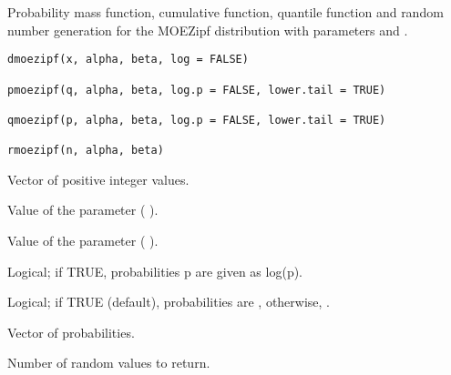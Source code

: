 \documentclass[letterpaper]{book}
\begin{document}
\begin{Description}\relax
Probability mass function, cumulative function, quantile function and random number
generation for the MOEZipf distribution with parameters \eqn{\alpha}{} and \eqn{\beta}{}.
\end{Description}
%
\begin{Usage}
\begin{verbatim}
dmoezipf(x, alpha, beta, log = FALSE)

pmoezipf(q, alpha, beta, log.p = FALSE, lower.tail = TRUE)

qmoezipf(p, alpha, beta, log.p = FALSE, lower.tail = TRUE)

rmoezipf(n, alpha, beta)
\end{verbatim}
\end{Usage}
%
\begin{Arguments}
\begin{ldescription}
\item[\code{x, q}] Vector of positive integer values.

\item[\code{alpha}] Value of the \eqn{\alpha}{} parameter ( ).

\item[\code{beta}] Value of the \eqn{\beta}{} parameter ( ).

\item[\code{log, log.p}] Logical; if TRUE, probabilities p are given as log(p).

\item[\code{lower.tail}] Logical; if TRUE (default), probabilities are , otherwise, .

\item[\code{p}] Vector of probabilities.

\item[\code{n}] Number of random values to return.
\end{ldescription}
\end{Arguments}
%
\end{document}

